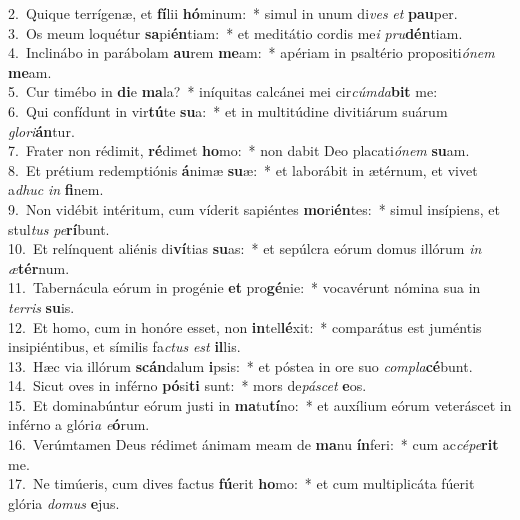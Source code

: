 {2.~}Quique terrígenæ, et \textbf{fí}lii \textbf{hó}minum:~* simul in unum di\textit{ves} \textit{et} \textbf{pau}per.\\
{3.~}Os meum loquétur \textbf{sa}pi\textbf{én}tiam:~* et meditátio cordis me\textit{i} \textit{pru}\textbf{dén}tiam.\\
{4.~}Inclinábo in parábolam \textbf{au}rem \textbf{me}am:~* apériam in psaltério propositi\textit{ó}\textit{nem} \textbf{me}am.\\
{5.~}Cur timébo in \textbf{di}e \textbf{ma}la?~* iníquitas calcánei mei cir\textit{cúm}\textit{da}\textbf{bit} me:\\
{6.~}Qui confídunt in vir\textbf{tú}te \textbf{su}a:~* et in multitúdine divitiárum suárum \textit{glo}\textit{ri}\textbf{án}tur.\\
{7.~}Frater non rédimit, \textbf{ré}dimet \textbf{ho}mo:~* non dabit Deo placati\textit{ó}\textit{nem} \textbf{su}am.\\
{8.~}Et prétium redemptiónis \textbf{á}nimæ \textbf{su}æ:~* et laborábit in ætérnum, et vivet a\textit{dhuc} \textit{in} \textbf{fi}nem.\\
{9.~}Non vidébit intéritum, cum víderit sapiéntes \textbf{mo}ri\textbf{én}tes:~* simul insípiens, et stul\textit{tus} \textit{pe}\textbf{rí}bunt.\\
{10.~}Et relínquent aliénis di\textbf{ví}tias \textbf{su}as:~* et sepúlcra eórum domus illórum \textit{in} \textit{æ}\textbf{tér}num.\\
{11.~}Tabernácula eórum in progénie \textbf{et} pro\textbf{gé}nie:~* vocavérunt nómina sua in \textit{ter}\textit{ris} \textbf{su}is.\\
{12.~}Et homo, cum in honóre esset, non \textbf{in}tel\textbf{lé}xit:~* comparátus est juméntis insipiéntibus, et símilis fa\textit{ctus} \textit{est} \textbf{il}lis.\\
{13.~}Hæc via illórum \textbf{scán}dalum \textbf{i}psis:~* et póstea in ore suo \textit{com}\textit{pla}\textbf{cé}bunt.\\
{14.~}Sicut oves in inférno \textbf{pó}si\textbf{ti} sunt:~* mors de\textit{pá}\textit{scet} \textbf{e}os.\\
{15.~}Et dominabúntur eórum justi in \textbf{ma}tu\textbf{tí}no:~* et auxílium eórum veteráscet in inférno a glóri\textit{a} \textit{e}\textbf{ó}rum.\\
{16.~}Verúmtamen Deus rédimet ánimam meam de \textbf{ma}nu \textbf{ín}feri:~* cum ac\textit{cé}\textit{pe}\textbf{rit} me.\\
{17.~}Ne timúeris, cum dives factus \textbf{fú}erit \textbf{ho}mo:~* et cum multiplicáta fúerit glória \textit{do}\textit{mus} \textbf{e}jus.\\
